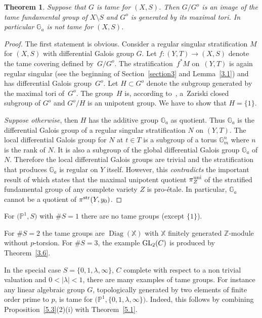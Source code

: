 \documentclass[10pt,a4paper]{amsart}
\numberwithin{equation}{section}
\newtheorem{Theorem}{Theorem}[section]
\begin{document}
\begin{Theorem}\label{3.7} Suppose that $G$ is tame for $(X,S)$. Then $G/G^o$ is an image of the tame fundamental group of $X\setminus S$ and $G^o$ is generated by its maximal tori. In particular $\mathbb{G}_a$ is not tame for $(X,S)$.
\end{Theorem}
\begin{proof} The first statement is obvious. Consider a regular singular stratification $M$ for $(X,S)$ with differential Galois group $G$. Let $f\colon (Y,T)\rightarrow (X,S)$ denote the tame covering defined by~$G/G^o$. The stratification~$f^*M$ on~$(Y,T)$ is again regular singular (see the beginning of Section~\ref{section3} and Lemma~\ref{3.1})
 and has differential Galois group~$G^o$. Let $H\subset G^o$ denote the subgroup generated by the maximal tori of~$G^o$. The group~$H$ is, according to~\cite[Proposition~13.3.10]{Sp}, a~Zariski closed subgroup of $G^o$ and $G^o/H$ is an unipotent group. We have to show that $H=\{1\}$.

{\it Suppose otherwise}, then $H$ has the additive group $\mathbb{G}_a$ as quotient. Thus $\mathbb{G}_a$ is the differential Galois group of a regular singular stratification $N$ on $(Y, T)$. The local differential Galois group for $N$ at $t\in T$ is a subgroup of a torus $\mathbb{G}_m^n$ where $n$ is the rank of $N$. It is also a subgroup of the global differential Galois group $\mathbb{G}_a$ of $N$. Therefore the local differential Galois groups are trivial and the stratification that produces $\mathbb{G}_a$ is regular on $Y$ itself. However, this {\it contradicts} the important result of \cite[Corollary~16]{Sa} which states that the maximal unipotent quotient $\pi _Z^{\rm uni}$ of the stratified fundamental group of any complete variety $Z$ is pro-\'etale. In particular, $\mathbb{G}_a$ cannot be a quotient of $\pi^{\rm str}(Y,y_0)$. \end{proof}

\begin{Examples} For $\big(\mathbb{P}^1,S\big)$ with $\#S=1$ there are no tame groups (except $\{1\}$).

For $\#S=2$ the tame groups are $\operatorname{Diag}(\mathbb{X})$ with $\mathbb{X}$ finitely generated $\mathbb{Z}$-module without $p$-torsion. For $\#S=3$, the example ${\rm GL}_2(C)$ is produced by Theorem~\ref{3.6}.

In the special case $S=\{0,1,\lambda ,\infty\}$, $C$ complete with respect to a non trivial valuation and $0<|\lambda |<1$, there are many examples of tame groups. For instance any linear algebraic group $G$, topologically generated by two elements of finite order prime to $p$, is tame for $\big(\mathbb{P}^1,\{0,1,\lambda ,\infty\}\big)$. Indeed, this follows by combining Proposition~\ref{5.3}(2)(i) with Theorem~\ref{5.1}.
\end{Examples}
\end{document}
